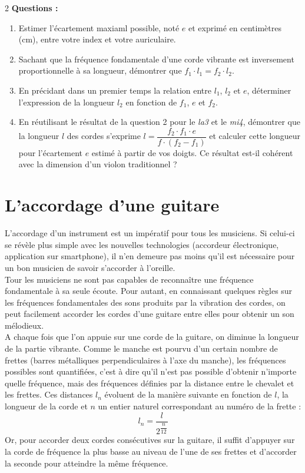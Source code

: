 \documentclass[a4paper,12pt,fleqn]{article}%
\begin{document}
\begin{multicols}{2}
\textbf{Questions :}
\begin{enumerate}
	\item Estimer l'écartement maxiaml possible, noté $e$ et exprimé en centimètres (\unit{\centi\meter}), entre votre index et votre auriculaire.
	\item Sachant que la fréquence fondamentale d'une corde vibrante est inversement proportionnelle à sa longueur, démontrer que $f_1 \cdot l_1 = f_2 \cdot l_2$.
	\item En précidant dans un premier temps la relation entre $l_1$, $l_2$ et $e$, déterminer l'expression de la longueur $l_2$ en fonction de $f_1$, $e$ et $f_2$.
	\item En réutilisant le résultat de la question 2 pour le \textit{la3} et le \textit{mi4}, démontrer que la longueur $l$ des cordes s'exprime $l=\dfrac{f_2 \cdot f_1 \cdot e}{f \cdot (f_2-f_1)}$ et calculer cette longueur pour l'écartement $e$ estimé à partir de vos doigts. Ce résultat est-il cohérent avec la dimension d'un violon traditionnel ?
\end{enumerate}

\section{L'accordage d'une guitare}
L’accordage d’un instrument est un impératif pour tous les musiciens. Si celui-ci se révèle plus simple avec les nouvelles technologies (accordeur électronique, application sur smartphone), il n’en demeure pas moins qu’il est nécessaire pour un bon musicien de savoir s’accorder à l’oreille.\\
Tour les musiciens ne sont pas capables de reconnaître une fréquence fondamentale à sa seule écoute. Pour autant, en connaissant quelques règles sur les fréquences fondamentales des sons produits par la vibration des cordes, on peut facilement accorder les cordes d’une guitare entre elles pour obtenir un son mélodieux.\\
A chaque fois que l’on appuie sur une corde de la guitare, on diminue la longueur de la partie vibrante. Comme le manche est pourvu d’un certain nombre de frettes (barres métalliques perpendiculaires à l’axe du manche), les fréquences possibles sont quantifiées, c’est à dire qu’il n’est pas possible d’obtenir n’importe quelle fréquence, mais des fréquences définies par la distance entre le chevalet et les frettes. Ces distances $l_n$ évoluent de la manière suivante en fonction de $l$, la longueur de la corde et $n$ un entier naturel correspondant au numéro de la frette : $$l_n = \dfrac{l}{2^{\dfrac{n}{12}}}$$
Or, pour accorder deux cordes consécutives sur la guitare, il suffit d’appuyer sur la corde de fréquence la plus basse au niveau de l’une de ses frettes et d’accorder la seconde pour atteindre la même fréquence.


\end{multicols}
\end{document}
